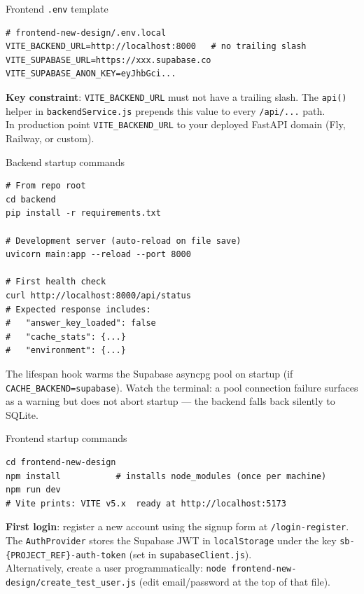 \documentclass[aspectratio=169]{beamer}
\begin{document}
\begin{frame}[fragile]{Frontend \texttt{.env} template}
\begin{lstlisting}[style=jsx]
# frontend-new-design/.env.local
VITE_BACKEND_URL=http://localhost:8000   # no trailing slash
VITE_SUPABASE_URL=https://xxx.supabase.co
VITE_SUPABASE_ANON_KEY=eyJhbGci...
\end{lstlisting}
\vfill
\small
\textbf{Key constraint}: \texttt{VITE\_BACKEND\_URL} must not have a trailing slash.
The \texttt{api()} helper in \texttt{backendService.js} prepends this value to every \texttt{/api/...} path.\\
In production point \texttt{VITE\_BACKEND\_URL} to your deployed FastAPI domain (Fly, Railway, or custom).
\end{frame}

\begin{frame}[fragile]{Backend startup commands}
\begin{lstlisting}[style=pys]
# From repo root
cd backend
pip install -r requirements.txt

# Development server (auto-reload on file save)
uvicorn main:app --reload --port 8000

# First health check
curl http://localhost:8000/api/status
# Expected response includes:
#   "answer_key_loaded": false
#   "cache_stats": {...}
#   "environment": {...}
\end{lstlisting}
\vfill
\small
The lifespan hook warms the Supabase asyncpg pool on startup (if \texttt{CACHE\_BACKEND=supabase}).
Watch the terminal: a pool connection failure surfaces as a warning but does not abort startup
--- the backend falls back silently to SQLite.
\end{frame}

\begin{frame}[fragile]{Frontend startup commands}
\begin{lstlisting}[style=jsx]
cd frontend-new-design
npm install           # installs node_modules (once per machine)
npm run dev
# Vite prints: VITE v5.x  ready at http://localhost:5173
\end{lstlisting}
\vfill
\small
\textbf{First login}: register a new account using the signup form at \texttt{/login-register}.
The \texttt{AuthProvider} stores the Supabase JWT in \texttt{localStorage} under the key
\texttt{sb-\{PROJECT\_REF\}-auth-token} (set in \texttt{supabaseClient.js}).\\[0.3em]
Alternatively, create a user programmatically:
\texttt{node frontend-new-design/create\_test\_user.js} (edit email/password at the top of that file).
\end{frame}
\end{document}
